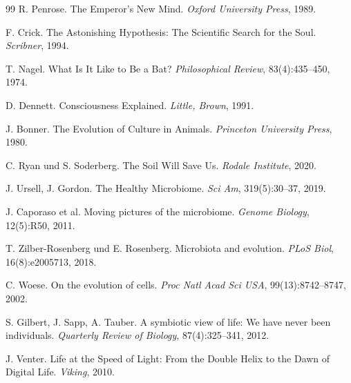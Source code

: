 \documentclass[a4paper,12pt]{article}
\theoremstyle{definition}
\begin{document}
\begin{thebibliography}{99}
    R. Penrose.
    The Emperor's New Mind.
    \textit{Oxford University Press}, 1989.

    F. Crick.
    The Astonishing Hypothesis: The Scientific Search for the Soul.
    \textit{Scribner}, 1994.

    T. Nagel.
    What Is It Like to Be a Bat?
    \textit{Philosophical Review}, 83(4):435--450, 1974.

    D. Dennett.
    Consciousness Explained.
    \textit{Little, Brown}, 1991.

    J. Bonner.
    The Evolution of Culture in Animals.
    \textit{Princeton University Press}, 1980.

    C. Ryan und S. Soderberg.
    The Soil Will Save Us.
    \textit{Rodale Institute}, 2020.

    J. Ursell, J. Gordon.
    The Healthy Microbiome.
    \textit{Sci Am}, 319(5):30--37, 2019.

    J. Caporaso et al.
    Moving pictures of the microbiome.
    \textit{Genome Biology}, 12(5):R50, 2011.

    T. Zilber-Rosenberg und E. Rosenberg.
    Microbiota and evolution.
    \textit{PLoS Biol}, 16(8):e2005713, 2018.

    C. Woese.
    On the evolution of cells.
    \textit{Proc Natl Acad Sci USA}, 99(13):8742--8747, 2002.

    S. Gilbert, J. Sapp, A. Tauber.
    A symbiotic view of life: We have never been individuals.
    \textit{Quarterly Review of Biology}, 87(4):325--341, 2012.

    J. Venter.
    Life at the Speed of Light: From the Double Helix to the Dawn of Digital Life.
    \textit{Viking}, 2010.

\end{thebibliography}
\end{document}
